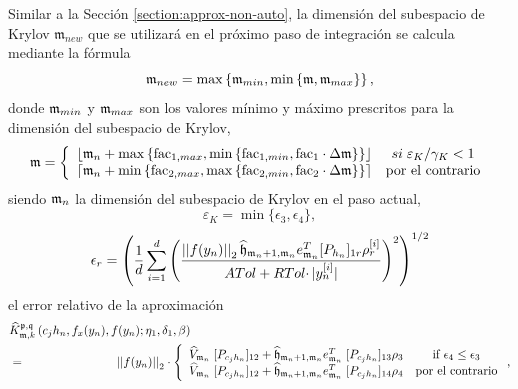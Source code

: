Similar a la Sección \ref{section:approx-non-auto}, la dimensión del subespacio de Krylov $\mathfrak{m}_{new}$ que se utilizará en el próximo paso de integración se calcula mediante la fórmula
\begin{equation}\label{calcmnew-fj}
	\mathfrak{m}_{new}= \max\left\{ \mathfrak{m}_{min}, \min\left\{ \mathfrak{m} , \mathfrak{m}_{max}  \right\} \right\},
	\end{equation}
donde $\mathfrak{m}_{min}$ y $\mathfrak{m}_{max}$ son los valores mínimo y máximo prescritos para la dimensión del subespacio de Krylov,
\begin{equation}
	\mathfrak{m} = \left\{
\begin{array}{cc}
\left\lfloor \mathfrak{m}_{n} + \max\left\{ \mathrm{fac}_{1,max} , \min\left\{ \mathrm{fac}_{1,min},
		\mathrm{fac}_1\cdot\Delta\mathfrak{m} \right\}  \right\} \right\rfloor & si \;  \varepsilon_{K}/\gamma_{K}< 1\\
\left\lceil \mathfrak{m}_{n} + \min\left\{ \mathrm{fac}_{2,max} , \max\left\{ \mathrm{fac}_{2,min},
		\mathrm{fac}_2\cdot\Delta\mathfrak{m} \right\}  \right\} \right\rceil  & \text{por el contrario}
\end{array}
\right. \label{m_unica}
\end{equation}
siendo $\mathfrak{m}_{n}$ la dimensión del subespacio de Krylov  en el paso actual,
\begin{equation} \label{errrel-fj}
	\varepsilon_{K} = \min \{\epsilon _{3},\epsilon _{4}\},
	\end{equation}
	\begin{equation*}
	\epsilon_{r} = \left(\frac{1}{d}\sum\limits_{i=1}^{d} \left(\frac{\left\lvert \left\lvert f(y_n) \right\rvert \right\rvert_2
		\widehat{\mathfrak{h}}_{\mathfrak{m}_n+1,\mathfrak{m}_n} e_{\mathfrak{m}_n}^T
		[P_{h_n}]_{1r} \rho_r^{[i]}}{ATol+ RTol\cdotp
		\lvert y_{n}^{[i]}\rvert}\right)^{2}\right)^{1/2}
\end{equation*}
el error relativo de la aproximación
\begin{eqnarray}
	&\widehat{K}_{\mathfrak{m},k}^{\mathfrak{p},\mathfrak{q}}\left(
	c_{j}h_{n},f_{x}(y_{n}),f(y_{n});\eta _{1},\delta _{1},\beta \right) &
	\label{eq:adapt_gen_kp_aprox} \\
	&=& \hspace{-2.5cm}\nnorm{\nnorm{f(y_n)}}_2 \cdot\left\{
	\begin{array}{cc}
	\widehat{V}_{\mathfrak{m}_n}\;[P_{c_{j}h_n}]_{12}+
	\widehat{\mathfrak{h}}_{\mathfrak{m}_n+1,\mathfrak{m}_n}e_{\mathfrak{m}_n }^{T}\;[P_{c_{j}h_n}]_{13}\rho _{3} & \text{if }\epsilon _{4}\leq \epsilon _{3}
	\\
	\widehat{V}_{\mathfrak{m}_n}\;[P_{c_{j}h_n}]_{12}+
	\widehat{\mathfrak{h}}_{\mathfrak{m}_n+1,\mathfrak{m}_n}e_{\mathfrak{m}_n }^{T}\;[P_{c_{j}h_n}]_{14}\rho _{4} & \text{por el contrario}%
	\end{array}
	\right. ,  \notag
\end{eqnarray}
